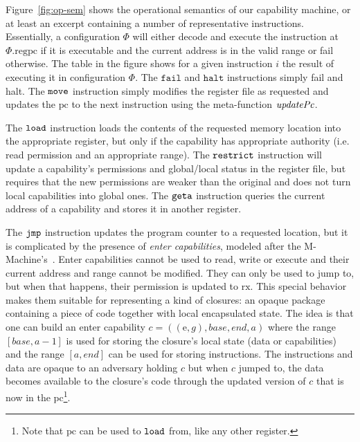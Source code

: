 \documentclass[compsoc,conference,letterpaper,fleqn]{IEEEtran}
\newcommand{\var}[1]{\mathit{#1}}
\newcommand{\gl}{\var{g}}
\newcommand{\pcreg}{\mathrm{pc}}
\newcommand{\addr}{\var{a}}
\newcommand{\start}{\var{base}}
\newcommand{\addrend}{\var{end}}
\newcommand{\plainproj}[1]{\mathrm{#1}}
\newcommand{\memreg}[1][\Phi]{#1.\plainproj{reg}}
\newcommand{\plainfun}[2]{
  \ifthenelse{\equal{#2}{}}
  {\mathit{#1}}
  {\mathit{#1}(#2)}
}
\newcommand{\stdUpdatePc}[1]{\plainfun{updatePc}{#1}}
\newcommand{\zinstr}[1]{\mathtt{#1}}
\newcommand{\fail}{\zinstr{fail}}
\newcommand{\halt}{\zinstr{halt}}
\newcommand{\oneinstr}[2]{
  \ifthenelse{\equal{#2}{}}
  {\zinstr{#1}}
  {\zinstr{#1} \; #2}
}
\newcommand{\jmp}[1]{\oneinstr{jmp}{#1}}
\newcommand{\twoinstr}[3]{
  \ifthenelse{\equal{#2#3}{}}
  {\zinstr{#1}}
  {\zinstr{#1} \; #2 \; #3}
}
\newcommand{\restricttwo}[2]{\twoinstr{restrict}{#1}{#2}}
\newcommand{\geta}[2]{\twoinstr{geta}{#1}{#2}}
\newcommand{\move}[2]{\twoinstr{move}{#1}{#2}}
\newcommand{\load}[2]{\twoinstr{load}{#1}{#2}}
\newcommand{\plainperm}[1]{\mathrm{#1}}
\newcommand{\exec}{\plainperm{rx}}
\newcommand{\entry}{\plainperm{e}}
\begin{document}
Figure~\ref{fig:op-sem} shows the operational semantics of our capability
machine, or at least an excerpt containing a number of representative
instructions. Essentially, a configuration $\Phi$ will either decode and execute
the instruction at $\memreg{\pcreg}$ if it is executable and the current address
is in the valid range or fail otherwise. The table in the figure shows for a
given instruction $i$ the result of executing it in configuration $\Phi$. The
$\fail$ and $\halt$ instructions simply fail and halt. The $\move{}{}$
instruction simply modifies the register file as requested and updates the
$\pcreg$ to the next instruction using the meta-function $\stdUpdatePc{}$.

The $\load{}{}$ instruction loads the contents of the requested memory location
into the appropriate register, but only if the capability has appropriate
authority (i.e. read permission and an appropriate range). The $\restricttwo{}{}$
instruction will update a capability's permissions and global/local status in
the register file, but requires that the new permissions are weaker than the
original and does not turn local capabilities into global ones. The $\geta{}{}$
instruction queries the current address of a capability and stores it in another
register.

The $\jmp{}$ instruction updates the program counter to a requested location,
but it is complicated by the presence of \emph{enter capabilities}, modeled
after the M-Machine's~\cite{Carter:1994:HSF:195473.195579}. Enter capabilities
cannot be used to read, write or execute and their current address and range
cannot be modified. They can only be used to jump to, but when that happens,
their permission is updated to $\exec$. This special behavior makes them
suitable for representing a kind of closures: an opaque package containing a
piece of code together with local encapsulated state. The idea is that one can
build an enter capability $c = ((\entry,\gl),\start,\addrend,\addr)$ where the
range $[\start,\addr-1]$ is used for storing the closure's local state (data or
capabilities) and the range $[\addr,\addrend]$ can be used for storing
instructions. The instructions and data are opaque to an adversary holding $c$
but when $c$ jumped to, the data becomes available to the closure's code through
the updated version of $c$ that is now in the $\pcreg$\footnote{Note that
  $\pcreg$ can be used to $\load{}{}$ from, like any other register.}.
\end{document}
